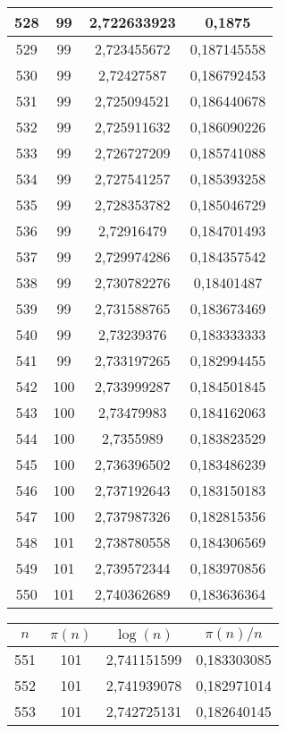 {\begin{minipage}[!h]{0.45\textwidth}
\begin{longtable}{cccc}
528 & 99 & 2,722633923 & 0,1875 \\ \hline
529 & 99 & 2,723455672 & 0,187145558 \\ \hline
530 & 99 & 2,72427587 & 0,186792453 \\ \hline
531 & 99 & 2,725094521 & 0,186440678 \\ \hline
532 & 99 & 2,725911632 & 0,186090226 \\ \hline
533 & 99 & 2,726727209 & 0,185741088 \\ \hline
534 & 99 & 2,727541257 & 0,185393258 \\ \hline
535 & 99 & 2,728353782 & 0,185046729 \\ \hline
536 & 99 & 2,72916479 & 0,184701493 \\ \hline
537 & 99 & 2,729974286 & 0,184357542 \\ \hline
538 & 99 & 2,730782276 & 0,18401487 \\ \hline
539 & 99 & 2,731588765 & 0,183673469 \\ \hline
540 & 99 & 2,73239376 & 0,183333333 \\ \hline
541 & 99 & 2,733197265 & 0,182994455 \\ \hline
542 & 100 & 2,733999287 & 0,184501845 \\ \hline
543 & 100 & 2,73479983 & 0,184162063 \\ \hline
544 & 100 & 2,7355989 & 0,183823529 \\ \hline
545 & 100 & 2,736396502 & 0,183486239 \\ \hline
546 & 100 & 2,737192643 & 0,183150183 \\ \hline
547 & 100 & 2,737987326 & 0,182815356 \\ \hline
548 & 101 & 2,738780558 & 0,184306569 \\ \hline
549 & 101 & 2,739572344 & 0,183970856 \\ \hline
550 & 101 & 2,740362689 & 0,183636364 \\ \hline
\end{longtable}
\end{minipage}
\begin{minipage}[!h]{0.45\textwidth}\centering
\tiny
\begin{longtable}{cccc} \hline
\(n\) & \(\pi(n)\) & \(\log(n)\) & \(\pi(n)/n\) \\ \hline
551 & 101 & 2,741151599 & 0,183303085 \\ \hline
552 & 101 & 2,741939078 & 0,182971014 \\ \hline
553 & 101 & 2,742725131 & 0,182640145 \\ \hline

\end{longtable}
\end{minipage}}
